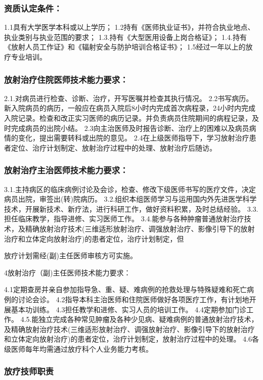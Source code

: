\subsubsection{资质认定条件：}

1.1具有大学医学本科或以上学历；
1.2持有《医师执业证书》，并符合执业地点、执业类别与执业范围的要求；
1.3.持有《大型医用设备上岗合格证》；
1.4.持有《放射人员工作证》和《辐射安全与防护培训合格证书》；
1.5经过一年以上的放疗专业培训。

\subsubsection{放射治疗住院医师技术能力要求：}

2.1.对病员进行检查、诊断、治疗，开写医嘱并检查其执行情况。
2.2书写病历。新入院病员的病历，一般应在病员入院后8小时内完成首次病程录，24小时内完成入院记录。检查和改正实习医师的病历记录。并负责病员住院期间的病程记录，及时完成病员的出院小结。
2.3向主治医师及时报告诊断、治疗上的困难以及病员病情的变化，提出需要转科或出院的意见。
2.4在上级医师指导下，学习放射治疗患者定位、治疗计划制定、放射治疗过程中的处理、放射治疗后随访。

\subsubsection{放射治疗主治医师技术能力要求：}

3.1.主持病区的临床病例讨论及会诊，检查、修改下级医师书写的医疗文件，决定病员出院，审签出(转)院病历。
3.2.组织本组医师学习与运用国内外先进医学科学技术，开展新技术、新疗法，进行科研工作，做好资料积累，及时总结经验。
3.3.担任临床教学，指导进修、实习医师工作。
3.4.能参与各种肿瘤普通放射治疗技术，及精确放射治疗技术(三维适形放射治疗、调强放射治疗、影像引导下的放射治疗和立体定向放射治疗)的患者定位，治疗计划制定，但

放疗计划需经(副)主任医师审核方可实施。

4放射治疗（副)主任医师技术能力要求：

4.1定期查房并亲自参加指导急、重、疑、难病例的抢救处理与特殊疑难和死亡病例的讨论会诊。
4.2指导本科主治医师和住院医师做好各项医疗工作，有计划地开展基本功训练。
4.3担任教学和进修、实习人员的培训工作。
4.4定期参加门诊工作。
4.5.能独立完成各种常见肿瘤及各种少见病、疑难病例的普通放射治疗技术，及精确放射治疗技术(三维适形放射治疗、调强放射治疗、影像引导下的放射治疗和立体定向放射治疗)的患者定位，治疗计划制定，放射治疗过程中的处理。
4.6各级医师每年均需通过放疗科个人业务能力考核。

\subsubsection{放疗技师职责}

